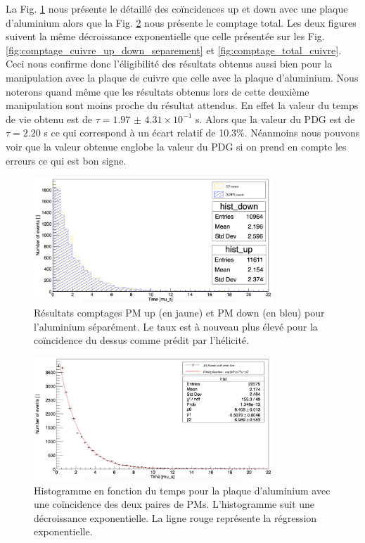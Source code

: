 \documentclass[12pt]{article}
\begin{document}
La Fig. \ref{fig:comptage_Aluminium_up_down_separement} nous présente le détaillé des coïncidences up et down avec une plaque d'aluminium alors que la Fig. \ref{fig:comptage_total_aluminium} nous présente le comptage total. Les deux figures suivent la même décroissance exponentielle que celle présentée sur les Fig. \ref{fig:comptage_cuivre_up_down_separement} et \ref{fig:comptage_total_cuivre}. Ceci nous confirme donc l'éligibilité des résultats obtenus aussi bien pour la manipulation avec la plaque de cuivre que celle avec la plaque d'aluminium. Nous noterons quand même que les résultats obtenus lors de cette deuxième manipulation sont moins proche du résultat attendus. En effet la valeur du temps de vie obtenu est de $\tau=1.97$ $\pm$ $4.31\times10^{-1}$ \SIUnitSymbolMicro s. Alors que la valeur du PDG est de $\tau=2.20$ \SIUnitSymbolMicro s ce qui correspond à un écart relatif de 10.3\%. Néanmoins nous pouvons voir que la valeur obtenue englobe la valeur du PDG si on prend en compte les erreurs ce qui est bon signe. 

\begin{figure}
    \centering
    \includegraphics[width=0.8\textwidth]{graphiques/experience1/Aluminium/comptage_Aluminium_up_down_separement.png}
    \caption{Résultats comptages PM up (en jaune) et PM down (en bleu) pour l'aluminium séparément. Le taux est à nouveau plus élevé pour la coïncidence du dessus comme prédit par l'hélicité.}
    \label{fig:comptage_Aluminium_up_down_separement}
\end{figure}

\begin{figure}
    \centering
    \includegraphics[width=0.8\textwidth]{graphiques/experience1/Aluminium/comptage_total_Aluminium.png}
    \caption{Histogramme en fonction du temps pour la plaque d'aluminium avec une coïncidence des deux paires de PMs. L’histogramme suit une décroissance exponentielle. La ligne rouge représente la régression exponentielle.}
    \label{fig:comptage_total_aluminium}
\end{figure}
\end{document}
